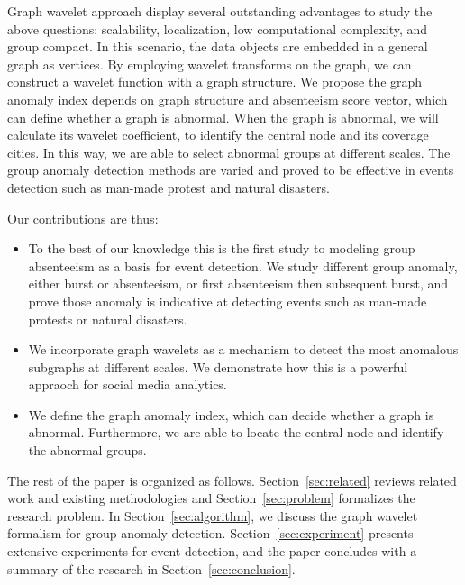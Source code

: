 \documentclass[conference]{IEEEtran}
\begin{document}
Graph wavelet approach display several outstanding advantages to study the above
questions: scalability, localization, low computational complexity, and group compact. In this scenario, the data objects are embedded in a general graph as vertices.
By employing wavelet transforms on the graph, we can construct a wavelet function with a graph structure. We propose the graph anomaly index depends on graph structure and absenteeism score vector, which can define whether a graph is abnormal. When the graph is abnormal, we will calculate its wavelet coefficient, to identify the central node and its coverage cities. In this way, we are able to select abnormal groups at different scales. The group anomaly detection methods are varied and proved to be effective in events detection such as man-made protest and natural disasters.


Our contributions are thus:
\begin{itemize}
\item To the best of our knowledge this is the first study to modeling group absenteeism as a basis for event detection. We study different group anomaly, either burst or absenteeism, or first absenteeism then subsequent burst, and prove those anomaly is indicative at detecting events such as man-made protests or natural disasters.
\item We incorporate graph wavelets as a mechanism to detect the most anomalous subgraphs at different scales. We demonstrate how this is a powerful appraoch for social media analytics.
\item We define the graph anomaly index, which can decide whether a graph is abnormal. Furthermore, we are able to locate the central node and identify the abnormal groups.
\end{itemize}

The rest of the paper is organized as follows. Section~\ref{sec:related} reviews related work and existing methodologies and Section~\ref{sec:problem} formalizes the research problem. In Section~\ref{sec:algorithm}, we discuss the graph wavelet formalism for group anomaly detection.
Section~\ref{sec:experiment} presents extensive experiments for event detection, and the paper concludes with a summary of the research in Section~\ref{sec:conclusion}.
\end{document}
